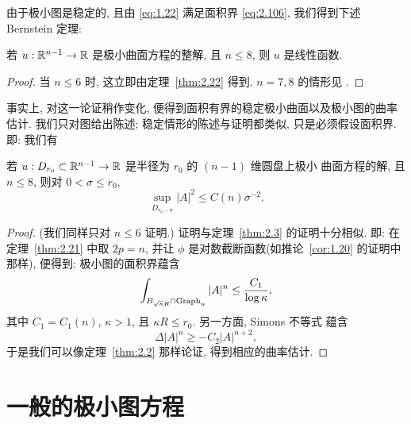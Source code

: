 由于极小图是稳定的, 且由 \eqref{eq:1.22} 满足面积界 \eqref{eq:2.106}, 我们得到下述 Bernstein
定理:

\begin{theorem}[S. Bernstein \cite{Be}(当 $n=3$), E. De Giorgi \cite{DG}
(当 $n=4$), F. J. Almgren, Jr. \cite{Am1}(当 $n=5$), 以及 J. Simons
\cite{Sim}(当 $n\leq8$)]
\label{thm:2.23}
若 $u:\mathbb{R}^{n-1}\to\mathbb{R}$ 是极小曲面方程的整解, 且 $n\leq8$, 则 $u$ 是线性函数.
\end{theorem}

\begin{proof}
当 $n\leq6$ 时, 这立即由定理~\ref{thm:2.22} 得到. $n=7,8$ 的情形见 \cite{Sim}.
\end{proof}

事实上, 对这一论证稍作变化, 便得到面积有界的稳定极小曲面以及极小图的曲率
估计. 我们只对图给出陈述; 稳定情形的陈述与证明都类似, 只是必须假设面积界.
即: 我们有

\begin{theorem}[E. Heinz \cite{He}(当 $n=3$), Schoen--Simon--Yau \cite{ScSiYa}
(当 $n\leq6$), 以及 L. Simon \cite{Si1}(当 $n\leq8$)]
\label{thm:2.24}
若 $u:D_{r_0}\subset\mathbb{R}^{n-1}\to\mathbb{R}$ 是半径为 $r_0$ 的 $(n-1)$ 维圆盘上极小
曲面方程的解, 且 $n\leq8$, 则对 $0<\sigma\leq r_0$,
\begin{equation}
\sup_{D_{r_0-\sigma}}|A|^{2}\leq C(n)\sigma^{-2}.
\label{eq:2.109}
\end{equation}
\end{theorem}

\begin{proof}
(我们同样只对 $n\leq6$ 证明.) 证明与定理~\ref{thm:2.3} 的证明十分相似. 即: 在
定理~\ref{thm:2.21} 中取 $2p=n$, 并让 $\phi$ 是对数截断函数(如推论~\ref{cor:1.20}
的证明中那样), 便得到: 极小图的面积界蕴含
\begin{equation}
\int_{B_{\sqrt{\kappa}R}\cap\operatorname{Graph}_u}|A|^{n}
 \leq\frac{C_1}{\log\kappa},
\label{eq:2.110}
\end{equation}
其中 $C_1=C_1(n)$, $\kappa>1$, 且 $\kappa R\leq r_0$. 另一方面, Simons 不等式
蕴含
\begin{equation}
\Delta|A|^{n}\geq-C_2|A|^{n+2},
\label{eq:2.111}
\end{equation}
于是我们可以像定理~\ref{thm:2.2} 那样论证, 得到相应的曲率估计.
\end{proof}

\section{一般的极小图方程}
\label{sec:2.6}

